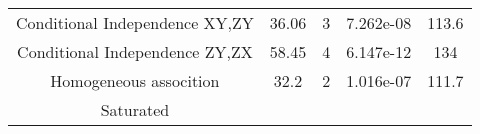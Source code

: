 \documentclass[]{article}
\begin{document}
\begin{longtable}[c]{@{}ccccc@{}}
\begin{minipage}[t]{0.37\columnwidth}
Conditional Independence XY,ZY
\strut\end{minipage} &
\begin{minipage}[t]{0.07\columnwidth}\centering\strut
36.06
\strut\end{minipage} &
\begin{minipage}[t]{0.06\columnwidth}\centering\strut
3
\strut\end{minipage} &
\begin{minipage}[t]{0.12\columnwidth}\centering\strut
7.262e-08
\strut\end{minipage} &
\begin{minipage}[t]{0.06\columnwidth}\centering\strut
113.6
\strut\end{minipage}\tabularnewline
\begin{minipage}[t]{0.37\columnwidth}\centering\strut
Conditional Independence ZY,ZX
\strut\end{minipage} &
\begin{minipage}[t]{0.07\columnwidth}\centering\strut
58.45
\strut\end{minipage} &
\begin{minipage}[t]{0.06\columnwidth}\centering\strut
4
\strut\end{minipage} &
\begin{minipage}[t]{0.12\columnwidth}\centering\strut
6.147e-12
\strut\end{minipage} &
\begin{minipage}[t]{0.06\columnwidth}\centering\strut
134
\strut\end{minipage}\tabularnewline
\begin{minipage}[t]{0.37\columnwidth}\centering\strut
Homogeneous assocition
\strut\end{minipage} &
\begin{minipage}[t]{0.07\columnwidth}\centering\strut
32.2
\strut\end{minipage} &
\begin{minipage}[t]{0.06\columnwidth}\centering\strut
2
\strut\end{minipage} &
\begin{minipage}[t]{0.12\columnwidth}\centering\strut
1.016e-07
\strut\end{minipage} &
\begin{minipage}[t]{0.06\columnwidth}\centering\strut
111.7
\strut\end{minipage}\tabularnewline
\begin{minipage}[t]{0.37\columnwidth}\centering\strut
Saturated
\strut\end{minipage} &

\end{longtable}
\end{document}
